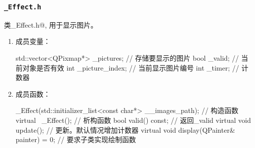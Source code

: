 \documentclass[UTF8,12pt]{ctexart}
\begin{document}
	        \subsubsection{\tt \_Effect.h}
	            类\cppinline@_Effect.h@, 用于显示图片。
	            \begin{enumerate}[nosep,label={\arabic*.}]
	                \item 成员变量：
	                    \begin{cppcode}
                            std::vector<QPixmap*> _pictures; // 存储要显示的图片
                            bool _valid; // 当前对象是否有效
                            int _picture_index; // 当前显示图片编号
                            int _timer; // 计数器
                        \end{cppcode}
	                \item 成员函数：
	                    \begin{cppcode}
                            _Effect(std::initializer_list<const char*> __images_path); // 构造函数
                            virtual ~_Effect(); // 析构函数
                            bool valid() const; // 返回_valid
                            virtual void update(); // 更新。默认情况增加计数器
                            virtual void display(QPainter& painter) = 0; // 要求子类实现绘制函数
                        \end{cppcode}
	            \end{enumerate}
\end{document}
